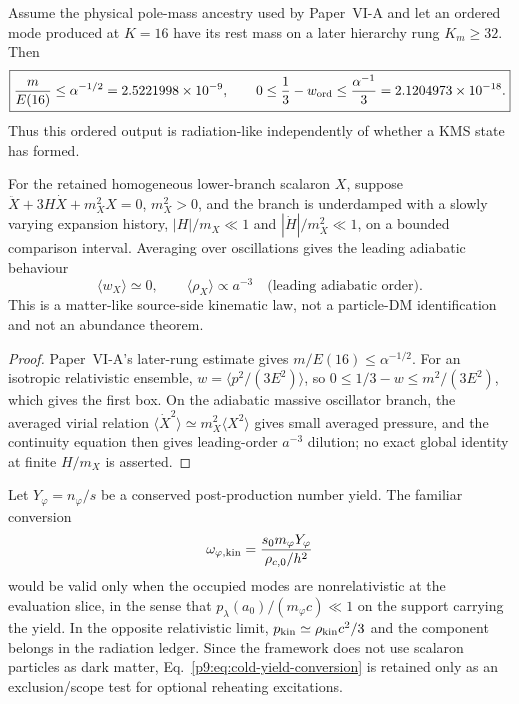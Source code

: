 \documentclass[12pt,a4paper]{article}
\begin{document}
\begin{theorem}
\label{p9:thm:transported-hot-cold-kinematic-split}
Assume the physical pole-mass ancestry used by Paper~VI-A and let an ordered
mode produced at \(K=16\) have its rest mass on a later hierarchy rung
\(K_m\ge32\).  Then
\begin{equation}
\label{p9:eq:transported-produced-radiation-bound}
 \boxed{
 \frac{m}{E(16)}\le\alpha^{-1/2}
 =2.5221998\times10^{-9},
 \qquad
 0\le\frac13-w_{\rm ord}
 \le\frac{\alpha^{-1}}3
 =2.1204973\times10^{-18}.}
\end{equation}
Thus this ordered output is radiation-like independently of whether a KMS
state has formed.

For the retained homogeneous lower-branch scalaron \(X\), suppose
\(\ddot X+3H\dot X+m_X^2X=0\), \(m_X^2>0\), and the branch is underdamped with a slowly varying expansion history,
\(|H|/m_X\ll1\) and \(|\dot H|/m_X^2\ll1\), on a bounded comparison
interval. Averaging over oscillations gives the leading adiabatic behaviour
\begin{equation}
\label{p9:eq:transported-retained-scalaron-matter-bound}
 \boxed{\langle w_X\rangle\simeq0,
 \qquad \langle\rho_X\rangle\propto a^{-3}
 \quad\text{(leading adiabatic order)}.}
\end{equation}
This is a matter-like source-side kinematic law, not a particle-DM
identification and not an abundance theorem.
\end{theorem}

\begin{proof}
Paper~VI-A's later-rung estimate gives \(m/E(16)\le\alpha^{-1/2}\).
For an isotropic relativistic ensemble,
\(w=\langle p^2/(3E^2)\rangle\), so
\(0\le1/3-w\le m^2/(3E^2)\), which gives the first box.  On the adiabatic
massive oscillator branch, the averaged virial relation
\(\langle\dot X^2\rangle\simeq m_X^2\langle X^2\rangle\) gives
small averaged pressure, and the continuity equation then gives
leading-order \(a^{-3}\) dilution; no exact global identity at finite
\(H/m_X\) is asserted.
\end{proof}

\begin{theorem}
\label{p9:thm:scalaron-cold-yield-criterion}
Let \(Y_\varphi=n_\varphi/s\) be a conserved post-production number yield.
The familiar conversion
\begin{equation}
\label{p9:eq:cold-yield-conversion}
\omega_{\varphi,\rm kin}
=\frac{s_0m_\varphi Y_\varphi}{\rho_{c,0}/h^2}
\end{equation}
would be valid only when the occupied modes are nonrelativistic at the evaluation
slice, in the sense that
\(p_\lambda(a_0)/(m_\varphi c)\ll1\) on the support carrying the yield.  In the
opposite relativistic limit, \(p_{\rm kin}\simeq\rho_{\rm kin}c^2/3\) and the
component belongs in the radiation ledger.  Since the framework does not use
scalaron particles as dark matter, Eq.~\eqref{p9:eq:cold-yield-conversion} is
retained only as an exclusion/scope test for optional reheating excitations.
\end{theorem}
\end{document}
